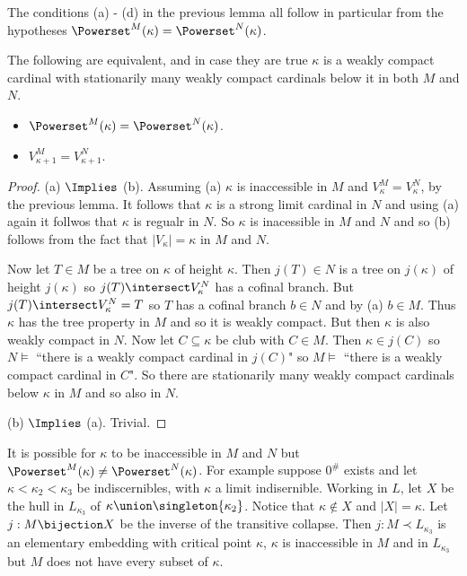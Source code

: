 \documentclass[oneside,12pt]{amsart}
\begin{document}
The conditions (a) - (d) in the previous lemma all follow in particular from the
hypotheses $\Powerset^{M}(\kappa) = \Powerset^{N}(\kappa)$.

\begin{lemma}
\label{equivalence2}
The following are equivalent, and in case they are true
$\kappa$ is a weakly compact cardinal with stationarily many weakly
compact cardinals below it in both $M$ and $N$.
\begin{itemize}
\item[(a)]  $\Powerset^{M}(\kappa) = \Powerset^{N}(\kappa)$.

\item[(b)] $V^{M}_{\kappa + 1} = V^{N}_{\kappa + 1}$.
\end{itemize}
\end{lemma}
\begin{proof}
(a) $\Implies$ (b). Assuming (a) $\kappa$ is inaccessible in $M$
and $V^{M}_{\kappa} = V^{N}_{\kappa}$, by the previous lemma. It follows
that $\kappa$ is a strong limit cardinal in $N$ and using (a) again it follwos
that $\kappa$ is regualr in $N$. So $\kappa$ is inacessible in $M$ and $N$ and
so (b) follows from the fact that $|V_{\kappa}| = \kappa$ in $M$ and $N$.

Now let $T\in M$ be a tree on $\kappa$ of height $\kappa$. Then $j(T) \in N$ is
a tree on $j(\kappa)$ of height $j(\kappa)$ so $j(T)\intersect V^{N}_{\kappa}$
has a cofinal branch. But $j(T)\intersect V^{N}_{\kappa} = T$ so $T$ has a cofinal
branch  $b\in N$ and by (a) $b\in M$. Thus $\kappa$ has the tree property in
$M$ and so it is weakly compact. But then $\kappa$ is also weakly compact in
$N$. Now let $C\subseteq\kappa$ be club with $C\in M$. Then $\kappa\in j(C)$
so $N\models$ ``there is a weakly compact cardinal in $j(C)$" so
$M\models$ ``there is a weakly compact cardinal in $C$". So there are stationarily
many weakly compact cardinals below $\kappa$ in $M$ and so also in $N$.

(b) $\Implies$ (a). Trivial.
\end{proof}

\begin{example}
It is possible for $\kappa$ to be inaccessible in $M$ and $N$ but
$\Powerset^{M}(\kappa) \not= \Powerset^{N}(\kappa)$. For example suppose
$0^{\#}$ exists and let $\kappa < \kappa_2 < \kappa_3$ be indiscernibles,
with $\kappa$ a limit indisernible.
Working in $L$, let $X$ be the hull in
$L_{\kappa_3}$ of $\kappa \union \singleton{\kappa_2}$.
Notice that $\kappa \notin X$ and $|X| = \kappa$. Let $j : M \bijection X$
be the inverse of the transitive collapse. Then
$j:M \prec L_{\kappa_3}$ is an elementary embedding with critical point
$\kappa$, $\kappa$ is inaccessible
in $M$ and in $L_{\kappa_3}$ but $M$ does not have every subset of $\kappa$.
\end{example}
\end{document}
